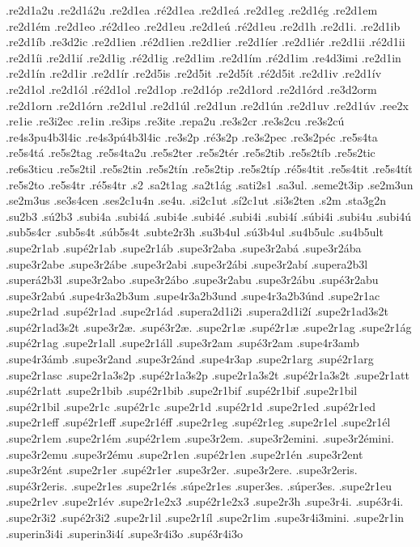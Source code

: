 {.re2d1a2u
.re2d1á2u
.re2d1ea
.ré2d1ea
.re2d1eá
.re2d1eg
.re2d1ég
.re2d1em
.re2d1ém
.re2d1eo
.ré2d1eo
.re2d1eu
.re2d1eú
.ré2d1eu
.re2d1h
.re2d1i.
.re2d1ib
.re2d1íb
.re3d2ic
.re2d1ien
.ré2d1ien
.re2d1ier
.re2d1íer
.re2d1iér
.re2d1ii
.ré2d1ii
.re2d1íi
.re2d1ií
.re2d1ig
.ré2d1ig
.re2d1im
.re2d1ím
.ré2d1im
.re4d3imi
.re2d1in
.re2d1ín
.re2d1ir
.re2d1ír
.re2d5is
.re2d5it
.re2d5ít
.ré2d5it
.re2d1iv
.re2d1ív
.re2d1ol
.re2d1ól
.ré2d1ol
.re2d1op
.re2d1óp
.re2d1ord
.re2d1órd
.re3d2orm
.re2d1orn
.re2d1órn
.re2d1ul
.re2d1úl
.re2d1un
.re2d1ún
.re2d1uv
.re2d1úv
.ree2x
.re1ie
.re3i2ec
.re1in
.re3ips
.re3ite
.repa2u
.re3s2cr
.re3s2cu
.re3s2cú
.re4s3pu4b3l4ic
.re4s3pú4b3l4ic
.re3s2p
.ré3s2p
.re3s2pec
.re3s2péc
.re5s4ta
.re5s4tá
.re5s2tag
.re5s4ta2u
.re5s2ter
.re5s2tér
.re5s2tib
.re5s2tíb
.re5s2tic
.re6s3ticu
.re5s2til
.re5s2tin
.re5s2tín
.re5s2tip
.re5s2típ
.ré5s4tit
.re5s4tit
.re5s4tít
.re5s2to
.re5s4tr
.ré5s4tr
.s2
.sa2t1ag
.sa2t1ág
.sati2s1
.sa3ul.
.seme2t3ip
.se2m3un
.se2m3us
.se3s4cen
.ses2c1u4n
.se4u.
.si2c1ut
.sí2c1ut
.si3s2ten
.s2m
.sta3g2n
.su2b3
.sú2b3
.subi4a
.subi4á
.subi4e
.subi4é
.subi4i
.subi4í
.súbi4i
.subi4u
.subi4ú
.sub5s4cr
.sub5s4t
.súb5s4t
.subte2r3h
.su3b4ul
.sú3b4ul
.su4b5ulc
.su4b5ult
.supe2r1ab
.supé2r1ab
.supe2r1áb
.supe3r2aba
.supe3r2abá
.supe3r2ába
.supe3r2abe
.supe3r2ábe
.supe3r2abi
.supe3r2ábi
.supe3r2abí
.supera2b3l
.superá2b3l
.supe3r2abo
.supe3r2ábo
.supe3r2abu
.supe3r2ábu
.supé3r2abu
.supe3r2abú
.supe4r3a2b3um
.supe4r3a2b3und
.supe4r3a2b3únd
.supe2r1ac
.supe2r1ad
.supé2r1ad
.supe2r1ád
.supera2d1i2i
.supera2d1i2í
.supe2r1ad3s2t
.supé2r1ad3s2t
.supe3r2æ.
.supé3r2æ.
.supe2r1æ
.supé2r1æ
.supe2r1ag
.supe2r1ág
.supé2r1ag
.supe2r1all
.supe2r1áll
.supe3r2am
.supé3r2am
.supe4r3amb
.supe4r3ámb
.supe3r2and
.supe3r2ánd
.supe4r3ap
.supe2r1arg
.supé2r1arg
.supe2r1asc
.supe2r1a3s2p
.supé2r1a3s2p
.supe2r1a3s2t
.supé2r1a3s2t
.supe2r1att
.supé2r1att
.supe2r1bib
.supé2r1bib
.supe2r1bif
.supé2r1bif
.supe2r1bil
.supé2r1bil
.supe2r1c
.supé2r1c
.supe2r1d
.supé2r1d
.supe2r1ed
.supé2r1ed
.supe2r1eff
.supé2r1eff
.supe2r1éff
.supe2r1eg
.supé2r1eg
.supe2r1el
.supe2r1él
.supe2r1em
.supe2r1ém
.supé2r1em
.supe3r2em.
.supe3r2emini.
.supe3r2émini.
.supe3r2emu
.supe3r2ému
.supe2r1en
.supé2r1en
.supe2r1én
.supe3r2ent
.supe3r2ént
.supe2r1er
.supé2r1er
.supe3r2er.
.supe3r2ere.
.supe3r2eris.
.supé3r2eris.
.supe2r1es
.supe2r1és
.súpe2r1es
.super3es.
.súper3es.
.supe2r1eu
.supe2r1ev
.supe2r1év
.supe2r1e2x3
.supé2r1e2x3
.supe2r3h
.supe3r4i.
.supé3r4i.
.supe2r3i2
.supé2r3i2
.supe2r1il
.supe2r1íl
.supe2r1im
.supe3r4i3mini.
.supe2r1in
.superin3i4i
.superin3i4í
.supe3r4i3o
.supé3r4i3o
}
